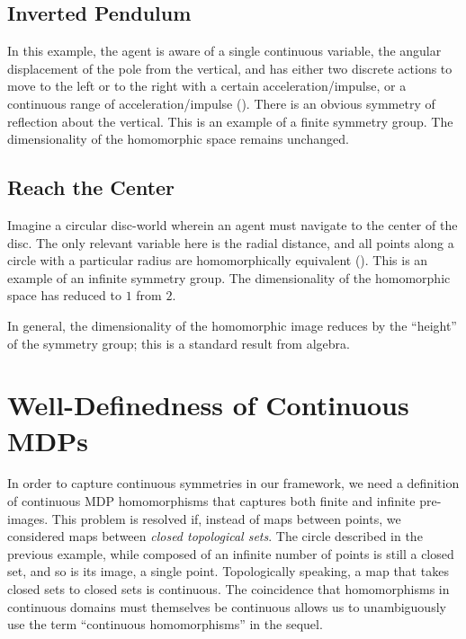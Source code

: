 \subsection{Inverted Pendulum} 
In this example, the agent is aware of a single continuous variable,
the angular displacement of the pole from the vertical, and has either
two discrete actions to move to the left or to the right with
a certain acceleration/impulse, or a continuous range of
acceleration/impulse ().  There is an
obvious symmetry of reflection about the vertical. This is an example
of a finite symmetry group. The dimensionality of the homomorphic
space remains unchanged.

\subsection{Reach the Center} 
Imagine a circular disc-world wherein an agent must navigate to the
center of the disc. The only relevant variable here is the radial
distance, and all points along a circle with a particular radius are
homomorphically equivalent (). This is an
example of an infinite symmetry group. The dimensionality of the
homomorphic space has reduced to $1$ from $2$. 

In general, the dimensionality of the homomorphic image reduces by the
``height'' of the symmetry group; this is a standard result from
algebra.

\section{Well-Definedness of Continuous MDPs}
\label{sec:hf:definition}

In order to capture continuous symmetries in our framework, we need
a definition of continuous MDP homomorphisms that captures both finite
and infinite pre-images. This problem is resolved if, instead of maps
between points, we considered maps between {\em closed topological
sets}. The circle described in the previous example, while composed of
an infinite number of points is still a closed set, and so is its
image, a single point. Topologically speaking, a map that takes closed
sets to closed sets is continuous. The coincidence that homomorphisms
in continuous domains must themselves be continuous allows us to
unambiguously use the term ``continuous homomorphisms'' in the
sequel.

